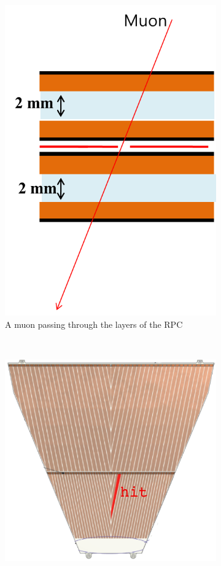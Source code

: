 \begin{figure}
  \centering
  \begin{subfigure}[b]{0.4\textwidth}
    \centering
    \includegraphics[width=0.8\linewidth]{./figures/rpc_1_muon_hit}
    \caption{A muon passing through the layers of the RPC}
    \label{fig:rpc_hit_side_view}
  \end{subfigure}%
  ~
  \begin{subfigure}[b]{0.4\textwidth}
    \centering
    \includegraphics[width=0.8\linewidth]{./figures/rpc_1_muon_hit_side}

\end{subfigure}
\end{figure}
